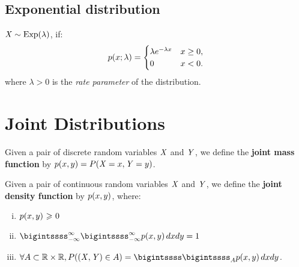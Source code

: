 \subsection{Exponential distribution}
\({\mathit{X}} \sim \text{Exp}(\lambda)\), if:
\begin{align*}
	p({x};\lambda) =
	\begin{cases}
		\lambda e^{-\lambda {x}} & {x} \ge 0, \\
		0 & {x} < 0.
	\end{cases}
\end{align*}
where \(\lambda > 0\) is the \emph{rate parameter} of the distribution.


\section{Joint Distributions}

\begin{definition}
	Given a pair of discrete random variables \({\mathit{X}}\) and \({\mathit{Y}}\), we define the \textbf{joint mass function} by \(p({x}, {y})=P({\mathit{X}}={x},{\mathit{Y}}={y})\).
\end{definition}
\begin{definition}
	Given a pair of continuous random variables \({\mathit{X}}\) and \({\mathit{Y}}\), we define the \textbf{joint density function} by \(p({x}, {y})\), where:
	\begin{enumerate}
		[i.]
		\item \(p({x}, {y}) {~\geqslant ~} 0\)
		\item \(\bigintssss_{-\infty}^{\infty}\bigintssss_{-\infty}^{\infty}p(\rx,\ry) \, d\rx d\ry =1\)
		\item \(\forall A \subset \Real \times \Real, P((\rvX,\rvY)\in A)=\bigintssss\bigintssss_{A}p(\rx,\ry)\, d\rx d\ry \).
	\end{enumerate}
\end{definition}


